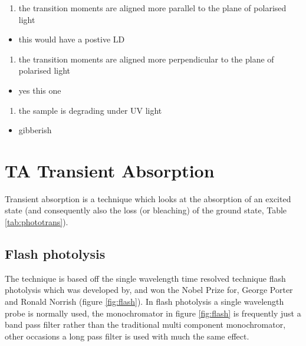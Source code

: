 \documentclass[
]{book}
\providecommand{\tightlist}{%
  \setlength{\itemsep}{0pt}\setlength{\parskip}{0pt}}
\begin{document}
\begin{enumerate}
\def\labelenumi{\alph{enumi}.}
\setcounter{enumi}{4}
\tightlist
\item
  the transition moments are aligned more parallel to the plane of polarised light
\end{enumerate}

\begin{itemize}
\tightlist
\item
  this would have a postive LD
\end{itemize}

\begin{enumerate}
\def\labelenumi{\alph{enumi}.}
\setcounter{enumi}{5}
\tightlist
\item
  the transition moments are aligned more perpendicular to the plane of polarised light
\end{enumerate}

\begin{itemize}
\tightlist
\item
  yes this one
\end{itemize}

\begin{enumerate}
\def\labelenumi{\alph{enumi}.}
\setcounter{enumi}{6}
\tightlist
\item
  the sample is degrading under UV light
\end{enumerate}

\begin{itemize}
\tightlist
\item
  gibberish
\end{itemize}

\hypertarget{ch:TA}{%
\chapter{TA Transient Absorption}\label{ch:TA}}

Transient absorption is a technique which looks at the absorption of an excited state (and consequently also the loss (or bleaching) of the ground state, Table \ref{tab:phototrans}).

\hypertarget{flash-photolysis}{%
\section{Flash photolysis}\label{flash-photolysis}}

The technique is based off the single wavelength time resolved technique flash photolysis which was developed by, and won the Nobel Prize for, George Porter and Ronald Norrish (figure \ref{fig:flash}). In flash photolysis a single wavelength probe is normally used, the monochromator in figure \ref{fig:flash} is frequently just a band pass filter rather than the traditional multi component monochromator, other occasions a long pass filter is used with much the same effect.
\end{document}
